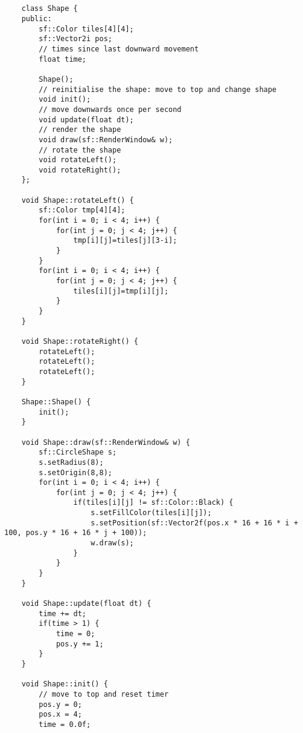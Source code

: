\documentclass[11pt]{amsart}
\begin{document}
\begin{verbatim}


	class Shape {
	public:
	    sf::Color tiles[4][4];
	    sf::Vector2i pos;
	    // times since last downward movement
	    float time;

	    Shape();
	    // reinitialise the shape: move to top and change shape
	    void init();
	    // move downwards once per second
	    void update(float dt);
	    // render the shape
	    void draw(sf::RenderWindow& w);
	    // rotate the shape
	    void rotateLeft();
	    void rotateRight();
	};

	void Shape::rotateLeft() {
	    sf::Color tmp[4][4];
	    for(int i = 0; i < 4; i++) {
	        for(int j = 0; j < 4; j++) {
	            tmp[i][j]=tiles[j][3-i];
	        }
	    }
	    for(int i = 0; i < 4; i++) {
	        for(int j = 0; j < 4; j++) {
	            tiles[i][j]=tmp[i][j];
	        }
	    }
	}

	void Shape::rotateRight() {
	    rotateLeft();
	    rotateLeft();
	    rotateLeft();
	}

	Shape::Shape() {
	    init();
	}

	void Shape::draw(sf::RenderWindow& w) {
	    sf::CircleShape s;
	    s.setRadius(8);
	    s.setOrigin(8,8);
	    for(int i = 0; i < 4; i++) {
	        for(int j = 0; j < 4; j++) {
	            if(tiles[i][j] != sf::Color::Black) {
	                s.setFillColor(tiles[i][j]);
	                s.setPosition(sf::Vector2f(pos.x * 16 + 16 * i + 100, pos.y * 16 + 16 * j + 100));
	                w.draw(s);
	            }
	        }
	    }
	}

	void Shape::update(float dt) {
	    time += dt;
	    if(time > 1) {
	        time = 0;
	        pos.y += 1;
	    }
	}

	void Shape::init() {
	    // move to top and reset timer
	    pos.y = 0;
	    pos.x = 4;
	    time = 0.0f;


\end{verbatim}
\end{document}
